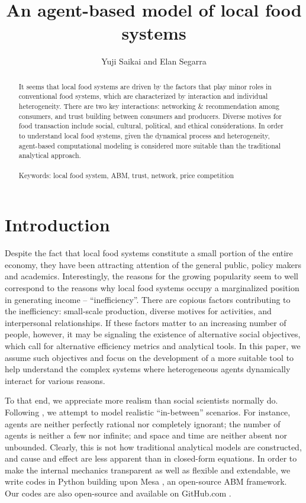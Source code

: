 \documentclass[11pt, oneside]{article}
\title{An agent-based model of local food systems}
\author{Yuji Saikai and Elan Segarra}
\begin{document}
\maketitle
\thispagestyle{empty} %
\vspace{5mm}

\begin{abstract}
\noindent 
It seems that local food systems are driven by the factors that play minor roles in conventional food systems, which are characterized by interaction and individual heterogeneity. There are two key interactions: networking \& recommendation among consumers, and trust building between consumers and producers. Diverse motives for food transaction include social, cultural, political, and ethical considerations. In order to understand local food systems, given the dynamical process and heterogeneity, agent-based computational modeling is considered more suitable than the traditional analytical approach.\\\\
\noindent
Keywords: local food system, ABM, trust, network, price competition
\end{abstract}

\pagebreak

\tableofcontents
\pagebreak

\section{Introduction}
Despite the fact that local food systems constitute a small portion of the entire economy, they have been attracting  attention of the general public, policy makers and academics. Interestingly, the reasons for the growing popularity seem to well correspond to the reasons why local food systems occupy a marginalized position in generating income -- ``inefficiency''. There are copious factors contributing to the inefficiency: small-scale production, diverse motives for activities, and interpersonal relationships. If these factors matter to an increasing number of people, however, it may be signaling the existence of alternative social objectives, which call for alternative efficiency metrics and analytical tools. In this paper, we assume such objectives and focus on the development of a more suitable tool to help understand the complex systems where heterogeneous agents dynamically interact for various reasons.

To that end, we appreciate more realism than social scientists normally do. Following \textcite{Miller2009}, we attempt to model realistic ``in-between'' scenarios. For instance, agents are neither perfectly rational nor completely ignorant; the number of agents is neither a few nor infinite; and space and time are neither absent nor unbounded. Clearly, this is not how traditional analytical models are constructed, and cause and effect are less apparent than in closed-form equations. In order to make the internal mechanics transparent as well as flexible and extendable, we write codes in Python building upon Mesa \parencite{Mesa2016}, an open-source ABM framework. Our codes are also open-source and available on GitHub.com \parencite{Saikai2016}.
\end{document}
